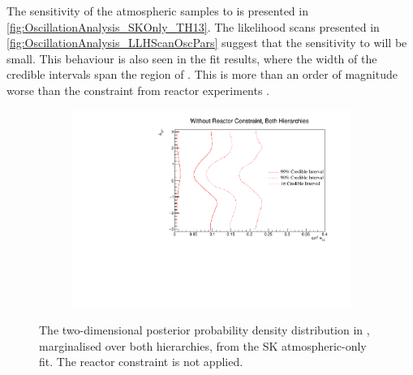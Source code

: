 The sensitivity of the atmospheric samples to  is presented in \autoref{fig:OscillationAnalysis_SKOnly_TH13}. The likelihood scans presented in \autoref{fig:OscillationAnalysis_LLHScanOscPars} suggest that the sensitivity to  will be small. This behaviour is also seen in the fit results, where the width of the \quickmath{1\sigma} credible intervals span the region of . This is more than an order of magnitude worse than the constraint from reactor experiments \cite{Particle_Data_Group2020-ms}.

\begin{figure}[h]
  \begin{subfigure}[t]{0.98\textwidth}
    \includegraphics[width=\textwidth, trim={0mm 0mm 0mm 0mm}, clip,page=1]{Figures/OA/SKOnlyFit/Contours_2D_th13_dcp_BH_0_woRC_UnSmeared_CredibleInterval.pdf}
  \end{subfigure}
  \caption{The two-dimensional posterior probability density distribution in , marginalised over both hierarchies, from the SK atmospheric-only fit. The reactor constraint is not applied.}
  \label{fig:OscillationAnalysis_SKOnly_DCPTH13}
\end{figure}

